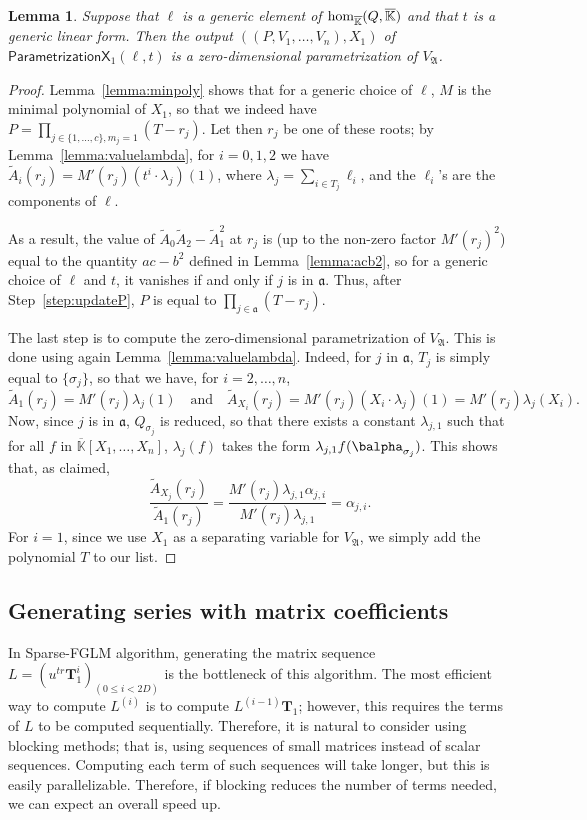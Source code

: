 \documentclass[12pt]{article}
\newtheorem{Lemma}{Lemma}
\def\Kbar {{\ensuremath{\overline{\mathbb{K}}}}}
\def\mT{\mathbf{T}}
\begin{document}
\begin{Lemma}
	Suppose that $\ell$ is a generic element of ${\rm
		hom}_{\Kbar}(Q,\Kbar)$ and that $t$ is a generic linear form. Then
	the output $((P,V_1,\dots,V_n),X_1)$ of
	$\mathsf{ParametrizationX}_1(\ell,t)$ is a zero-dimensional
	parametrization of $V_{\mathfrak{A}}$.
\end{Lemma}
\begin{proof}
	Lemma~\ref{lemma:minpoly} shows that for a generic choice of $\ell$,
	$M$ is the minimal polynomial of $X_1$, so that we indeed have
	$P=\prod_{j \in \{1,\dots,c\}, m_j=1} (T-r_j)$. Let then $r_j$ be
	one of these roots; by Lemma~\ref{lemma:valuelambda}, for $i=0,1,2$
	we have $\tilde A_i(r_j) = M'(r_j) (t^i \cdot \lambda_j)(1)$, where
	$\lambda_j =\sum_{i \in T_j} \ell_i$, and the $\ell_i$'s are the
	components of $\ell$. 
	
	As a result, the value of $\tilde A_0 \tilde A_2 - \tilde A_1^2$ at
	$r_j$ is (up to the non-zero factor $M'(r_j)^2$) equal to the
	quantity $ac-b^2$ defined in Lemma~\ref{lemma:acb2}, so for a
	generic choice of $\ell$ and $t$, it vanishes if and only if $j$ is
	in $\mathfrak{a}$. Thus, after Step~\ref{step:updateP}, 
	$P$ is equal to $\prod_{j \in \mathfrak{a}} (T-r_j)$.
	
	The last step is to compute the zero-dimensional parametrization of
	$V_{\mathfrak{A}}$. This is done using again
	Lemma~\ref{lemma:valuelambda}. Indeed, for $j$ in $\mathfrak{a}$, 
	$T_j$ is simply equal to $\{\sigma_j\}$, so that we have, for $i=2,\dots,n$,
	$$\tilde A_1(r_j)=M'(r_j) \lambda_j(1) \quad\text{and}\quad \tilde
	A_{X_i}(r_j) = M'(r_j) (X_i \cdot \lambda_j)(1) = M'(r_j) \lambda_j(X_i).$$ Now, since $j$
	is in $\mathfrak{a}$, $Q_{\sigma_j}$ is reduced, so that there
	exists a constant $\lambda_{j,1}$ such that for all $f$ in
	$\Kbar[X_1,\dots,X_n]$, $\lambda_j(f)$ takes the form $\lambda_{j,1}
	f(\balpha_{\sigma_j})$. This shows that, as claimed,
	$$\frac{\tilde A_{X_j}(r_j)}{\tilde A_1 (r_j)} = \frac
	{M'(r_j) \lambda_{j,1} \alpha_{j,i}}{M'(r_j) \lambda_{j,1}} = \alpha_{j,i}.$$
	For $i=1$, since we use $X_1$ as a separating variable for $V_{\mathfrak{A}}$, 
	we simply add the polynomial $T$ to our list.
\end{proof}

\subsection{Generating series with matrix coefficients}
In Sparse-FGLM algorithm, generating the matrix sequence 
$L = (u^{tr} \mT_1^i)_{(0 \le i < 2D)}$ is the bottleneck of this
algorithm. The most efficient way to compute $L^{(i)}$ is
to compute $L^{(i-1)}\mT_1$; however, this requires the terms
of $L$ to be computed sequentially. Therefore, it is natural to
consider using blocking methods; that is, using
sequences of small matrices instead of scalar
sequences. Computing each
term of such sequences will take longer, but this is easily
parallelizable. Therefore, if blocking reduces the number of terms
needed, we can expect an overall speed up.
\end{document}
